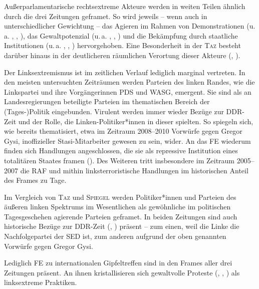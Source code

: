 Außerparlamentarische rechtsextreme Akteure werden in weiten Teilen ähnlich durch die drei Zeitungen geframet. So wird jeweils -- wenn auch in unterschiedlicher Gewichtung -- das Agieren im Rahmen von Demonstrationen (u.\,a. , , ), das Gewaltpotenzial (u.\,a. , , ) und die Bekämpfung durch staatliche Institutionen (u.\,a. , , ) hervorgehoben. Eine Besonderheit in der \textsc{Taz} besteht darüber hinaus in der deutlicheren räumlichen Verortung dieser Akteure (, ).

Der Linksextremismus ist im zeitlichen Verlauf lediglich marginal vertreten. In den meisten untersuchten Zeiträumen werden Parteien des linken Randes, wie die Linkspartei und ihre Vorgängerinnen PDS und WASG, emergent. Sie sind als an Landesregierungen beteiligte Parteien im thematischen Bereich der (Tages\mbox{-})Politik eingebunden. Virulent werden immer wieder Bezüge zur DDR-Zeit und der Rolle, die Linken-Politiker*innen in dieser spielten. So spiegeln sich, wie bereits thematisiert, etwa im Zeitraum 2008--2010 Vorwürfe gegen Gregor Gysi, inoffizieller Stasi-Mitarbeiter gewesen zu sein, wider. An das FE  wiederum finden sich Handlungen angeschlossen, die sie als repressive Institution eines totalitären Staates framen (). Des Weiteren tritt insbesondere im Zeitraum 2005--2007 die RAF und mithin linksterroristische Handlungen im historischen Anteil des Frames zu Tage.

Im Vergleich von \textsc{Taz} und \textsc{Spiegel} werden Politiker*innen und Parteien des äußeren linken Spektrums im Wesentlichen als gewöhnliche im politischen Tagesgeschehen agierende Parteien geframet. In beiden Zeitungen sind auch historische Bezüge zur DDR-Zeit (, ) präsent -- zum einen, weil die Linke die Nachfolgepartei der SED ist, zum anderen aufgrund der oben genannten Vorwürfe gegen Gregor Gysi.

Lediglich FE zu internationalen Gipfeltreffen sind in den Frames aller drei Zeitungen präsent. An ihnen kristallisieren sich gewaltvolle Proteste (, , ) als linksextreme Praktiken.


